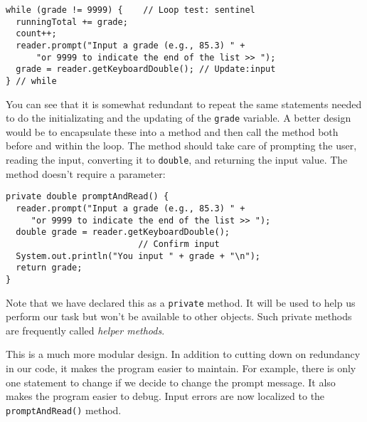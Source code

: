 \begin{jjjlisting}
\begin{lstlisting}
while (grade != 9999) {    // Loop test: sentinel
  runningTotal += grade;                            
  count++;                                          
  reader.prompt("Input a grade (e.g., 85.3) " +
      "or 9999 to indicate the end of the list >> ");
  grade = reader.getKeyboardDouble(); // Update:input
} // while
\end{lstlisting}
\end{jjjlisting}

\noindent You can see that it is somewhat redundant to repeat the same 
statements needed to do the initializating and the updating of
the {\tt grade} variable. A better design would be to encapsulate
these into a method and then call the method both before and within
the loop.  The method should take care of prompting the user, reading
the input, converting it to {\tt double}, and returning the input
value. The method doesn't require a parameter:

\begin{jjjlisting}
\begin{lstlisting}
private double promptAndRead() {
  reader.prompt("Input a grade (e.g., 85.3) " +
     "or 9999 to indicate the end of the list >> ");
  double grade = reader.getKeyboardDouble();
                          // Confirm input
  System.out.println("You input " + grade + "\n"); 
  return grade;
}
\end{lstlisting}
\end{jjjlisting}

\noindent Note that we have declared this as a {\tt private}
method. It will be used to help us perform our task but won't be
available to other objects. Such private methods are frequently called
{\em helper methods}.

This is a much more modular design. In addition to cutting down on
redundancy in our code, it makes the program easier to maintain. For
example, there is only one statement to change if we decide to change
the prompt message.  It also makes the program easier to debug. Input
errors are now localized to the {\tt promptAndRead()} method.


